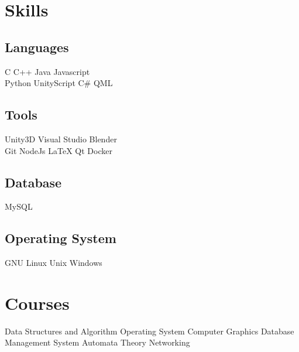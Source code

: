 \documentclass[]{rudra-resume-openfont}
\begin{document}
\begin{minipage}[t]{0.33\textwidth}

\section{Skills}

\subsection{Languages}
\textbullet{} C \textbullet{} C++ \textbullet{} Java \textbullet{} Javascript\\
\textbullet{} Python \textbullet{} UnityScript \textbullet{} C\# \textbullet{} QML

\subsection{Tools}
\textbullet{} Unity3D \textbullet{} Visual Studio \textbullet{} Blender \\
\textbullet{} Git \textbullet{} NodeJs \textbullet{} \LaTeX \textbullet{} Qt \textbullet{} Docker

\subsection{Database}
\textbullet{} MySQL 

\subsection{Operating System}
\textbullet{} GNU Linux \textbullet{} Unix \textbullet{} Windows

\section{Courses}
\textbullet{} Data Structures and Algorithm \textbullet{} Operating System \textbullet{}  Computer Graphics \textbullet{} Database Management System \textbullet{} Automata Theory \textbullet{} Networking


\end{minipage}
\end{document}
